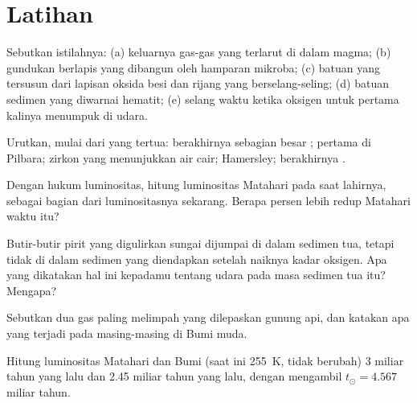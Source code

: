 \section{Latihan}

\begin{exercise}[$\star$]\label{exo:g12:early-earth:1}
Sebutkan istilahnya: (a) keluarnya gas-gas yang terlarut di dalam magma;
(b) gundukan berlapis yang dibangun oleh hamparan mikroba; (c) batuan yang
tersusun dari lapisan oksida besi dan rijang yang berselang-seling; (d) batuan
sedimen yang diwarnai hematit; (e) selang waktu ketika oksigen untuk pertama
kalinya menumpuk di udara.
\end{exercise}

\begin{exercise}[$\star$]\label{exo:g12:early-earth:2}
Urutkan, mulai dari yang tertua: berakhirnya sebagian besar ;  pertama di Pilbara; zirkon yang menunjukkan air cair;
 Hamersley; berakhirnya .
\end{exercise}

\begin{exercise}[$\star$]\label{exo:g12:early-earth:3}
Dengan hukum luminositas, hitung luminositas Matahari pada saat lahirnya,
sebagai bagian dari luminositasnya sekarang. Berapa persen lebih redup
Matahari waktu itu?
\end{exercise}

\begin{exercise}[$\star$]\label{exo:g12:early-earth:4}
Butir-butir pirit yang digulirkan sungai dijumpai di dalam sedimen tua, tetapi
tidak di dalam sedimen yang diendapkan setelah naiknya kadar oksigen. Apa yang
dikatakan hal ini kepadamu tentang udara pada masa sedimen tua itu? Mengapa?
\end{exercise}

\begin{exercise}[$\star$]\label{exo:g12:early-earth:5}
Sebutkan dua gas paling melimpah yang dilepaskan gunung api, dan katakan apa
yang terjadi pada masing-masing di Bumi muda.
\end{exercise}

\begin{exercise}[$\star\star$]\label{exo:g12:early-earth:6}
Hitung luminositas Matahari dan  Bumi (saat ini
\qty{255}{K},  tidak berubah) 3 miliar tahun yang lalu dan 2.45 miliar
tahun yang lalu, dengan mengambil $t_\odot = 4.567$ miliar tahun.
\end{exercise}

